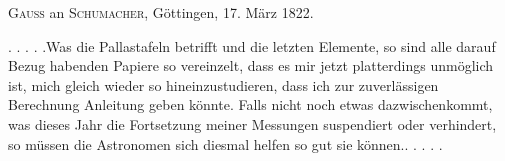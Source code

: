\par{}\bigskip
\begin{center}
\textsc{Gauss} an \textsc{Schumacher}, Göttingen, 17. März 1822.
\end{center}
\noindent\hspace*{\parindent}. . . . .\quad Was die Pallastafeln betrifft und die letzten Elemente, so sind alle darauf Bezug habenden Papiere so vereinzelt, dass es mir jetzt platterdings unmöglich ist, mich gleich wieder so hineinzustudieren, dass ich zur zuverlässigen Berechnung Anleitung geben könnte. Falls nicht noch etwas dazwischenkommt, was dieses Jahr die Fortsetzung meiner Messungen suspendiert oder verhindert, so müssen die Astronomen sich diesmal helfen so gut sie können.\quad . . . . .
\par
